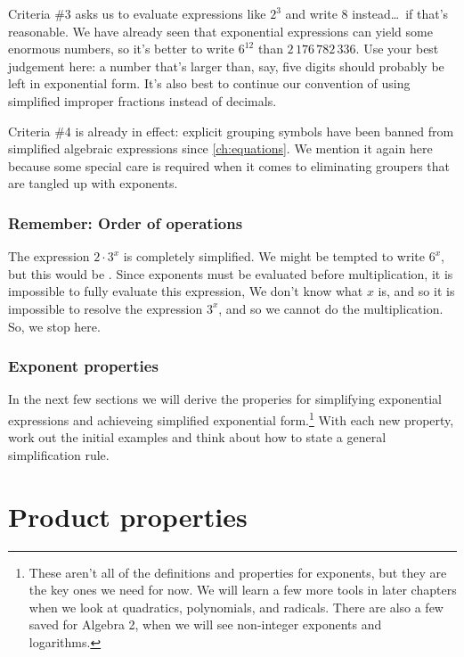 Criteria \#3 asks us to evaluate expressions like $2^3$ and write 8 instead\ldots\ if that's reasonable. We have already seen that exponential expressions can yield some enormous numbers, so it's better to write $6^{12}$ than $2\,176\,782\,336$. Use your best judgement here: a number that's larger than, say, five digits should probably be left in exponential form. It's also best to continue our convention of using simplified improper fractions instead of decimals.

Criteria \#4 is already in effect: explicit grouping symbols have been banned from simplified algebraic expressions since \cref{ch:equations}. We mention it again here because some special care is required when it comes to eliminating groupers that are tangled up with exponents.

\subsubsection{Remember: Order of operations}

The expression $2 \cdot 3^x$ is completely simplified. We might be tempted to write $6^x$, but this would be \evilandwrong. Since exponents must be evaluated before multiplication, it is impossible to fully evaluate this expression, We don't know what $x$ is, and so it is impossible to resolve the expression $3^x$, and so we cannot do the multiplication. So, we stop here.

\subsubsection{Exponent properties}

In the next few sections we will derive the properies for simplifying exponential expressions and achieveing simplified exponential form.\footnote{These aren't all of the definitions and properties for exponents, but they are the key ones we need for now. We will learn a few more tools in later chapters when we look at quadratics, polynomials, and radicals. There are also a few saved for Algebra 2, when we will see non-integer exponents and logarithms.} With each new property, work out the initial examples and think about how to state a general simplification rule.

\section{Product properties}
\label{sec:expoproduct}

